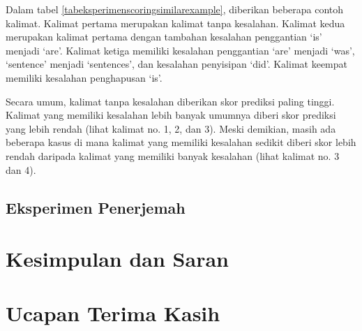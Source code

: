 \documentclass[conference]{IEEEtran}
\begin{document}
Dalam tabel \ref{tabeksperimenscoringsimilarexample}, diberikan beberapa contoh kalimat. Kalimat pertama merupakan kalimat tanpa kesalahan. Kalimat kedua merupakan kalimat pertama dengan tambahan kesalahan penggantian ‘is’ menjadi ‘are’. Kalimat ketiga memiliki kesalahan penggantian ‘are’ menjadi ‘was’, ‘sentence’ menjadi ‘sentences’, dan kesalahan penyisipan ‘did’. Kalimat keempat memiliki kesalahan penghapusan ‘is’.

Secara umum, kalimat tanpa kesalahan diberikan skor prediksi paling tinggi. Kalimat yang memiliki kesalahan lebih banyak umumnya diberi skor prediksi yang lebih rendah (lihat kalimat no. 1, 2, dan 3). Meski demikian, masih ada beberapa kasus di mana kalimat yang memiliki kesalahan sedikit diberi skor lebih rendah daripada kalimat yang memiliki banyak kesalahan (lihat kalimat no. 3 dan 4).

\subsection{Eksperimen Penerjemah}

\section{Kesimpulan dan Saran}

\section*{Ucapan Terima Kasih}
\end{document}
